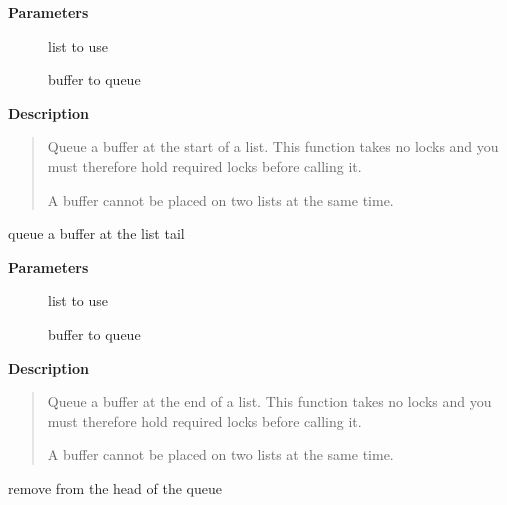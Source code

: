 \documentclass[a4paper,8pt,english]{sphinxmanual}
\begin{document}
\textbf{Parameters}
\begin{description}
\item[{}] \leavevmode
list to use

\item[{}] \leavevmode
buffer to queue

\end{description}

\textbf{Description}
\begin{quote}

Queue a buffer at the start of a list. This function takes no locks
and you must therefore hold required locks before calling it.

A buffer cannot be placed on two lists at the same time.
\end{quote}

\begin{fulllineitems}
\label{networking/kapi:c.skb_queue_tail}
queue a buffer at the list tail

\end{fulllineitems}


\textbf{Parameters}
\begin{description}
\item[{}] \leavevmode
list to use

\item[{}] \leavevmode
buffer to queue

\end{description}

\textbf{Description}
\begin{quote}

Queue a buffer at the end of a list. This function takes no locks
and you must therefore hold required locks before calling it.

A buffer cannot be placed on two lists at the same time.
\end{quote}

\begin{fulllineitems}
\label{networking/kapi:c.skb_dequeue}
remove from the head of the queue

\end{fulllineitems}
\end{document}
